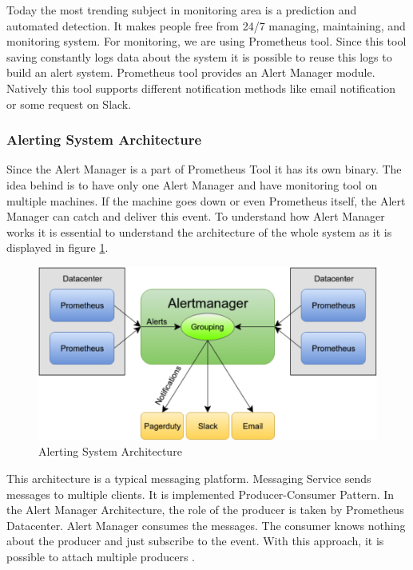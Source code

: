 Today the most trending subject in monitoring area is a prediction and automated detection. It makes people free from 24/7 managing, maintaining, and monitoring system.
For monitoring, we are using Prometheus tool. Since this tool saving constantly logs data about the system it is possible to reuse this logs to build an alert system. 
Prometheus tool provides an Alert Manager module. Natively this tool supports different notification methods like email notification or some request on Slack. 

\subsubsection{Alerting System Architecture}\label{Alerting System Architecture}

Since the Alert Manager is a part of Prometheus Tool it has its own binary. The idea behind is to have only one Alert Manager and have monitoring tool on multiple machines. If the machine goes down or even Prometheus itself, the Alert Manager can catch and deliver this event. 
To understand how Alert Manager works it is essential to understand the architecture of the whole system as it is displayed in figure \ref{fig:alert_arch}.

\begin{figure}[htbp]
\begin{center}
  \includegraphics[scale=0.6]{components/3/alert_arch.png}
  \caption{Alerting System Architecture}
  \label{fig:alert_arch}
\end{center}
\end{figure}

This architecture is a typical messaging platform.
Messaging Service sends messages to multiple clients. It is implemented Producer-Consumer Pattern. In the Alert Manager Architecture, the role of the producer is taken by Prometheus Datacenter. Alert Manager consumes the messages. The consumer knows nothing about the producer and just subscribe to the event. With this approach, it is possible to attach multiple producers \cite{alert_book}. 

